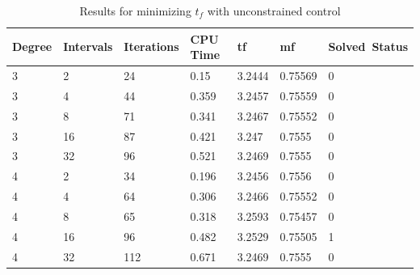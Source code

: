 \documentclass[]{article}
\begin{document}
\begin{table}
	\begin{tabular}{lllllll}
		Degree & Intervals & Iterations & CPU Time & tf & mf & Solved\ Status \\ 
		\hline 
		3 & 2 & 24 & 0.15 & 3.2444 & 0.75569 & 0 \\ 
		3 & 4 & 44 & 0.359 & 3.2457 & 0.75559 & 0 \\ 
		3 & 8 & 71 & 0.341 & 3.2467 & 0.75552 & 0 \\ 
		3 & 16 & 87 & 0.421 & 3.247 & 0.7555 & 0 \\ 
		3 & 32 & 96 & 0.521 & 3.2469 & 0.7555 & 0 \\ 
		4 & 2 & 34 & 0.196 & 3.2456 & 0.7556 & 0 \\ 
		4 & 4 & 64 & 0.306 & 3.2466 & 0.75552 & 0 \\ 
		4 & 8 & 65 & 0.318 & 3.2593 & 0.75457 & 0 \\ 
		4 & 16 & 96 & 0.482 & 3.2529 & 0.75505 & 1 \\ 
		4 & 32 & 112 & 0.671 & 3.2469 & 0.7555 & 0 \\ 
		\hline 
	\end{tabular}
	\caption{Results for minimizing \(t_f\) with unconstrained control}
	\label{table:1}
\end{table}
\FloatBarrier
\end{document}
